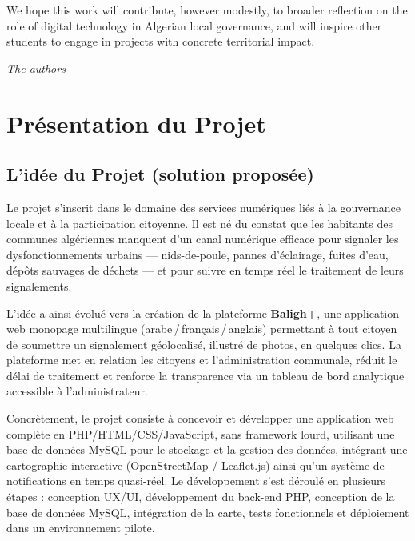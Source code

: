 \documentclass[12pt,a4paper]{report}
\begin{document}
We hope this work will contribute, however modestly, to broader reflection on
the role of digital technology in Algerian local governance, and will inspire
other students to engage in projects with concrete territorial impact.

\vspace{0.8cm}
\begin{flushright}
  \textit{The authors}
\end{flushright}

\newpage

\tableofcontents
\newpage

\chapter{Présentation du Projet}

\section{L'idée du Projet (solution proposée)}

Le projet s'inscrit dans le domaine des services numériques liés à la
gouvernance locale et à la participation citoyenne. Il est né du constat que
les habitants des communes algériennes manquent d'un canal numérique efficace
pour signaler les dysfonctionnements urbains — nids-de-poule, pannes
d'éclairage, fuites d'eau, dépôts sauvages de déchets — et pour suivre en temps
réel le traitement de leurs signalements.

L'idée a ainsi évolué vers la création de la plateforme \textbf{Baligh+}, une
application web monopage multilingue (arabe\,/\,français\,/\,anglais)
permettant à tout citoyen de soumettre un signalement géolocalisé, illustré de
photos, en quelques clics. La plateforme met en relation les citoyens et
l'administration communale, réduit le délai de traitement et renforce la
transparence via un tableau de bord analytique accessible à l'administrateur.

Concrètement, le projet consiste à concevoir et développer une application web
complète en PHP/HTML/CSS/JavaScript, sans framework lourd, utilisant une base
de données MySQL pour le stockage et la gestion des données, intégrant une
cartographie interactive (OpenStreetMap / Leaflet.js) ainsi qu'un système de
notifications en temps quasi-réel. Le développement s'est déroulé en plusieurs
étapes : conception UX/UI, développement du back-end PHP, conception de la base
de données MySQL, intégration de la carte, tests fonctionnels et déploiement
dans un environnement pilote.
\end{document}
